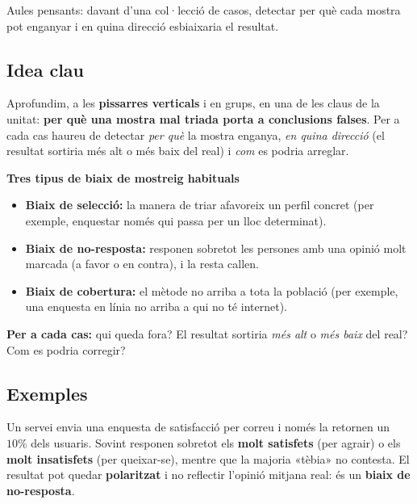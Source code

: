 %
{Aules pensants: davant d'una col·lecció de casos, detectar per què cada mostra pot enganyar i en quina direcció esbiaixaria el resultat.}

\subsection{Idea clau}

Aprofundim, a les \textbf{pissarres verticals} i en grups, en una de les claus de la
unitat: \textbf{per què una mostra mal triada porta a conclusions falses}. Per a cada cas
haureu de detectar \emph{per què} la mostra enganya, \emph{en quina direcció} (el resultat
sortiria més alt o més baix del real) i \emph{com} es podria arreglar.

\begin{idea}
\textbf{Tres tipus de biaix de mostreig habituals}
\begin{itemize}[leftmargin=1.4em, itemsep=3pt]
  \item \textbf{Biaix de selecció:} la manera de triar afavoreix un perfil concret (per
        exemple, enquestar només qui passa per un lloc determinat).
  \item \textbf{Biaix de no-resposta:} responen sobretot les persones amb una opinió molt
        marcada (a favor o en contra), i la resta callen.
  \item \textbf{Biaix de cobertura:} el mètode no arriba a tota la població (per exemple,
        una enquesta en línia no arriba a qui no té internet).
\end{itemize}
\textbf{Per a cada cas:} qui queda fora? El resultat sortiria \emph{més alt} o \emph{més
baix} del real? Com es podria corregir?
\end{idea}

\subsection{Exemples}

\begin{exemple}
Un servei envia una enquesta de satisfacció per correu i només la retornen un $10\%$ dels
usuaris. Sovint responen sobretot els \textbf{molt satisfets} (per agrair) o els
\textbf{molt insatisfets} (per queixar-se), mentre que la majoria «tèbia» no contesta. El
resultat pot quedar \textbf{polaritzat} i no reflectir l'opinió mitjana real: és un
\textbf{biaix de no-resposta}.
\end{exemple}

